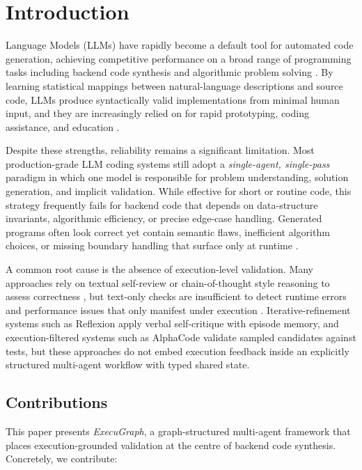 \documentclass[journal]{IEEEtran}
\begin{document}
\section{Introduction}
 Language Models (LLMs) have rapidly become a default tool for automated code generation, achieving competitive performance on a broad range of programming tasks including backend code synthesis and algorithmic problem solving \cite{brown2020gpt3,chen2021codex,hendrycks2021apps}. By learning statistical mappings between natural-language descriptions and source code, LLMs produce syntactically valid implementations from minimal human input, and they are increasingly relied on for rapid prototyping, coding assistance, and education \cite{chen2021codex,feng2020codebert,wang2021codet5}.

Despite these strengths, reliability remains a significant limitation. Most production-grade LLM coding systems still adopt a \emph{single-agent, single-pass} paradigm in which one model is responsible for problem understanding, solution generation, and implicit validation. While effective for short or routine code, this strategy frequently fails for backend code that depends on data-structure invariants, algorithmic efficiency, or precise edge-case handling. Generated programs often look correct yet contain semantic flaws, inefficient algorithm choices, or missing boundary handling that surface only at runtime \cite{chen2021codex,hendrycks2021apps}.

A common root cause is the absence of execution-level validation. Many approaches rely on textual self-review or chain-of-thought style reasoning to assess correctness \cite{wei2022cot,wang2022selfconsistency}, but text-only checks are insufficient to detect runtime errors and performance issues that only manifest under execution \cite{chen2018executionguided,gao2023pal}. Iterative-refinement systems such as Reflexion \cite{shinn2023reflexion} apply verbal self-critique with episode memory, and execution-filtered systems such as AlphaCode \cite{li2022alphacode} validate sampled candidates against tests, but these approaches do not embed execution feedback inside an explicitly structured multi-agent workflow with typed shared state.

\subsection{Contributions}
This paper presents \emph{ExecuGraph}, a graph-structured multi-agent framework that places execution-grounded validation at the centre of backend code synthesis. Concretely, we contribute:
\end{document}
